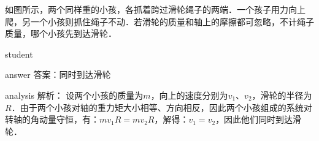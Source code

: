 \begin{example}
	如图所示，两个同样重的小孩，各抓着跨过滑轮绳子的两端．一个孩子用力向上爬，另一个小孩则抓住绳子不动．若滑轮的质量和轴上的摩擦都可忽略，不计绳子质量，哪个小孩先到达滑轮．
	
	\begin{taggedblock}{student}
		\vspace*{2cm}
	\end{taggedblock}
	
	
	\begin{taggedblock}{answer}
		答案：同时到达滑轮
	\end{taggedblock}
	
	
	\begin{taggedblock}{analysis}
		解析： 设两个小孩的质量为$ m $，向上的速度分别为$ v_1 $、$v_2$，滑轮的半径为$R$．由于两个小孩对轴的重力矩大小相等、方向相反，因此两个小孩组成的系统对转轴的角动量守恒，有：$mv_1 R=mv_2 R$，解得：$v_1=v_2$，因此他们同时到达滑轮．
	\end{taggedblock}
\end{example}


